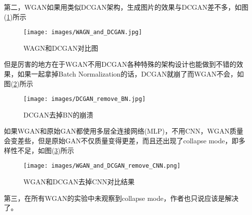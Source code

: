             第二，WGAN如果用类似DCGAN架构，生成图片的效果与DCGAN差不多，如图(\ref{fig:WAGN和DCGAN对比图})所示
                \begin{figure}[H]
                \centering
                \texttt{[image: images/WAGN\_and\_DCGAN.jpg]}
                \caption{WAGN和DCGAN对比图}
                \label{fig:WAGN和DCGAN对比图}
                \end{figure}
            但是厉害的地方在于WGAN不用DCGAN各种特殊的架构设计也能做到不错的效果，如果一起拿掉Batch Normalization的话，DCGAN就崩了而WGAN不会，如图(\ref{fig:DCGAN去掉BN的崩溃})所示
                \begin{figure}[H]
                \centering
                \texttt{[image: images/DCGAN\_remove\_BN.jpg]}
                \caption{DCGAN去掉BN的崩溃}
                \label{fig:DCGAN去掉BN的崩溃}
                \end{figure}
            如果WGAN和原始GAN都使用多层全连接网络(MLP)，不用CNN，WGAN质量会变差些，但是原始GAN不仅质量变得更差，而且还出现了collapse mode，即多样性不足，如图(\ref{fig:WGAN和DCGAN去掉CNN对比结果})所示
                \begin{figure}[H]
                \centering
                \texttt{[image: images/WGAN\_and\_DCGAN\_remove\_CNN.png]}
                \caption{WGAN和DCGAN去掉CNN对比结果}
                \label{fig:WGAN和DCGAN去掉CNN对比结果}
                \end{figure}
            第三，在所有WGAN的实验中未观察到collapse mode，作者也只说应该是解决了。


